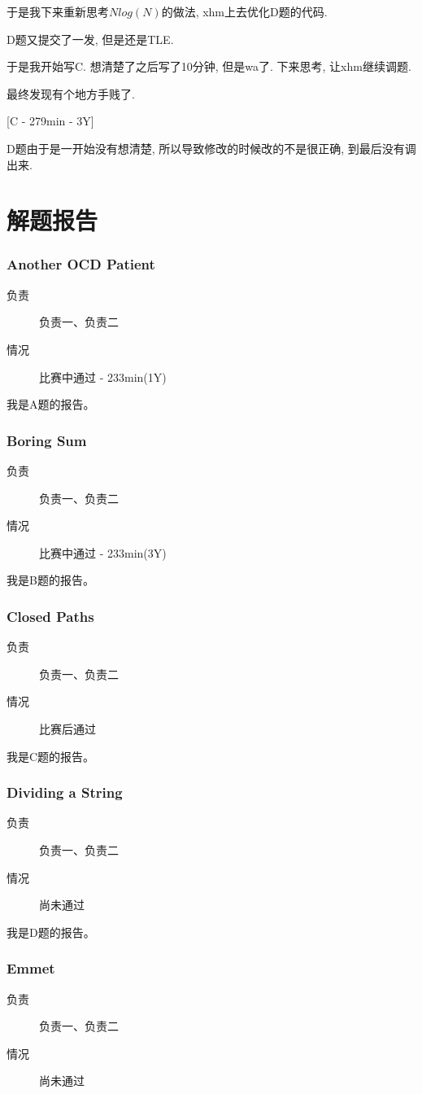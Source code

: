 \documentclass[a4paper, 11pt, nofonts, nocap, fancyhdr]{ctexart}
\newcommand{\problem}[1]{\subsubsection{#1}}
\begin{document}
于是我下来重新思考$Nlog(N)$的做法, xhm上去优化D题的代码.

D题又提交了一发, 但是还是TLE.

于是我开始写C. 想清楚了之后写了10分钟, 但是wa了. 下来思考, 让xhm继续调题.

最终发现有个地方手贱了.

[C - 279min - 3Y]

D题由于是一开始没有想清楚, 所以导致修改的时候改的不是很正确, 到最后没有调出来.

\section{解题报告}

\problem{Another OCD Patient}

\begin{description}
\item[负责] 负责一、负责二
\item[情况] 比赛中通过 - 233min(1Y)
\end{description}

我是A题的报告。

\problem{Boring Sum}

\begin{description}
\item[负责] 负责一、负责二
\item[情况] 比赛中通过 - 233min(3Y)
\end{description}

我是B题的报告。

\problem{Closed Paths}

\begin{description}
\item[负责] 负责一、负责二
\item[情况] 比赛后通过
\end{description}

我是C题的报告。

\problem{Dividing a String}

\begin{description}
\item[负责] 负责一、负责二
\item[情况] 尚未通过
\end{description}

我是D题的报告。

\problem{Emmet}

\begin{description}
\item[负责] 负责一、负责二
\item[情况] 尚未通过
\end{description}
\end{document}
